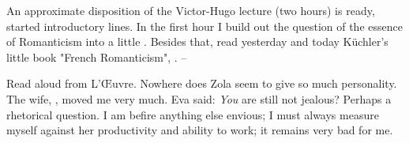 
An approximate disposition of the Victor-Hugo lecture (two hours) is ready, started introductory lines. In the first hour I build out the question of the essence of Romanticism into a little . Besides that, read yesterday and today Küchler's little book "French Romanticism", . -- \missing

Read aloud from L'\OE uvre. Nowhere does Zola seem to give so much personality. The wife, , moved me very much. Eva said: \textit{You} are still not jealous? Perhaps a rhetorical question. I am befire anything else envious; I must always measure myself against her productivity and ability to work; it remains very bad for me.